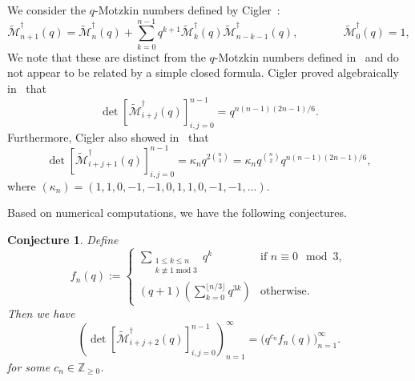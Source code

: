 \documentclass[11pt, leqno]{amsart}
\theoremstyle{plain}
\newtheorem{conjecture}[theorem]{Conjecture}
\theoremstyle{definition}
\numberwithin{equation}{section}
\newcommand{\seteq}{\mathbin{:=}}
\newcommand{\Mot}{\mathcal{M}} %
\newcommand{\qbinom}[3]{\left[ \begin{matrix} #1 \\ #2 \end{matrix} \right]_{#3}} %
\newcommand{\Z}{\mathbb{Z}}
\begin{document}

We consider the $q$-Motzkin numbers defined by Cigler~\cite{Cigler99}:
\[
\widetilde{\Mot}^{\dagger}_{n+1}(q) = \widetilde{\Mot}^{\dagger}_n(q) + \sum_{k=0}^{n-1} q^{k+1} \widetilde{\Mot}^{\dagger}_k(q) \widetilde{\Mot}^{\dagger}_{n-k-1}(q),
\qquad\qquad \widetilde{\Mot}^{\dagger}_0(q) = 1,
\]
We note that these are distinct from the $q$-Motzkin numbers defined in~\cite{BDLFP98,BSS93} and do not appear to be related by a simple closed formula. Cigler proved algebraically in~\cite[Eq.~(39)]{Cigler99} that
\[
\det [ \widetilde{\Mot}^{\dagger}_{i+j}(q) ]_{i,j=0}^{n-1} = q^{n(n-1)(2n-1)/6}.
\]
Furthermore, Cigler also showed in~\cite[Eq.~(40)]{Cigler99} that
\[
\det [ \widetilde{\Mot}^{\dagger}_{i+j+1}(q) ]_{i,j=0}^{n-1} = \kappa_n q^{2\binom{n}{3}} = \kappa_n q^{\binom{n}{2}} q^{n(n-1)(2n-1)/6},
\]
where $(\kappa_n) = (1,1,0,-1,-1,0,1,1,0,-1,-1,\ldots)$.

Based on numerical computations, we have the following conjectures.

\begin{conjecture}
\label{conj:factored_motzkin_2shifted}
Define
\[
f_n(q) \seteq \begin{cases}
\displaystyle \sum_{\substack{1 \leq k \leq n \\ k \not\equiv 1 \;\mathrm{mod}\; 3}} q^k & \text{if } n \equiv 0 \mod{3}, \\
\displaystyle (q+1) \left( \sum_{k=0}^{\lfloor n/3 \rfloor} q^{3k} \right) & \text{otherwise}.
\end{cases}
\]
Then we have
\[
\left( \det \left[ \widetilde{\Mot}^{\dagger}_{i+j+2}(q) \right]_{i,j=0}^{n-1} \right)_{n=1}^{\infty} = \bigl( q^{c_n} f_n(q) \bigr)_{n=1}^{\infty}.
\]
for some $c_n \in \Z_{\geq 0}$.
\end{conjecture}
\end{document}
